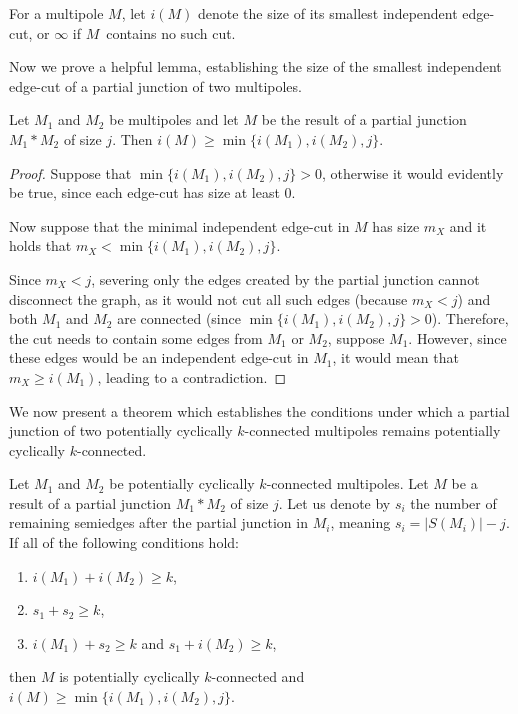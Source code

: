 \documentclass[12pt, twoside]{book}
\begin{document}
\begin{definition}
	For a multipole $M$, let $i(M)$ denote the size of its smallest independent edge-cut, or $\infty$ if $M$~contains no such cut.
\end{definition}

Now we prove a helpful lemma, establishing the size of the smallest independent edge-cut of a partial junction of two multipoles.

\begin{lemma}\label{lem:size-of-minimal-potentially-cycle-separating-after-junction}
	Let $M_1$ and $M_2$ be multipoles and let $M$ be the result of a partial junction $M_1*M_2$ of size $j$. Then $i(M)\geq \min\{i(M_1),i(M_2),j\}$.
\end{lemma}

\begin{proof}
	Suppose that $\min\{i(M_1),i(M_2),j\}>0$, otherwise it would evidently be true, since each edge-cut has size at least 0.
	
	Now suppose that the minimal independent edge-cut in $M$ has size $m_X$ and it holds that ${m_X<\min\{i(M_1),i(M_2),j\}}$.
	
	Since $m_X<j$, severing only the edges created by the partial junction cannot disconnect the graph, as it would not cut all such edges (because $m_X<j$) and both $M_1$ and $M_2$ are connected (since ${\min\{i(M_1),i(M_2),j\}>0}$). Therefore, the cut needs to contain some edges from $M_1$ or $M_2$, suppose $M_1$. However, since these edges would be an independent edge-cut in $M_1$, it would mean that $m_X\geq i(M_1)$, leading to a contradiction.
\end{proof}

We now present a theorem which establishes the conditions under which a partial junction of two potentially cyclically $k$-connected multipoles remains potentially cyclically $k$-connected. 

\begin{theorem}\label{th:connecting-potentially-cyclically-connected-with-number-of-resulting-semiedges}
	Let $M_1$ and $M_2$ be potentially cyclically $k$-connected multipoles. Let $M$ be a result of a partial junction $M_1*M_2$ of size $j$. Let us denote by $s_i$ the number of remaining semiedges after the partial junction in $M_i$, meaning ${s_i=|S(M_i)|-j}$. If all of the following conditions hold:
	\begin{enumerate}[label=(\roman*)]
		\item $i(M_1)+i(M_2)\geq k$,
		\item $s_1+s_2\geq k$,
		\item $i(M_1)+s_2\geq k$ and $s_1+i(M_2)\geq k$,
	\end{enumerate}
	then $M$ is potentially cyclically $k$-connected and $i(M)\geq \min\{i(M_1), i(M_2), j\}$.
\end{theorem}
\end{document}
